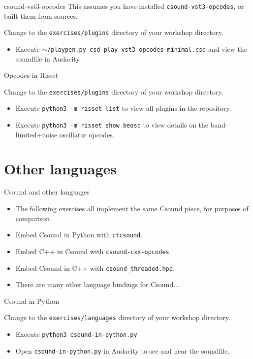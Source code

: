 \documentclass{beamer}
\begin{document}
\begin{frame}{csound-vst3-opcodes}
This assumes you have installed \texttt{csound-vst3-opcodes}, or built them from sources.
\begin{example}
Change to the \texttt{exercises/plugins} directory of your workshop directory.
\begin{itemize}
\item Execute \texttt{$\sim$/playpen.py csd-play vst3-opcodes-minimal.csd} and view the soundfile in Audacity.
\end{itemize}
\end{example}
\end{frame}

\begin{frame}{Opcodes in Risset}
\begin{example}
Change to the \texttt{exercises/plugins} directory of your workshop directory.
\begin{itemize}
\item Execute \texttt{python3 -m risset list} to view all plugins in the repository.
\item Execute \texttt{python3 -m risset show beosc} to view details on the band-limited+noise  oscillator opcodes.
\end{itemize}
\end{example}
\end{frame}

\section{Other languages}
\begin{frame}{Csound and other languages}
\begin{itemize}
\item The following exercises all implement the same Csound piece, for purposes of comparison.
\item Embed Csound in Python with \texttt{ctcsound}.
\item Embed C++ in Csound with \texttt{csound-cxx-opcodes}.
\item Embed Csound in C++ with \texttt{csound\_threaded.hpp}.
\item There are many other language bindings for Csound....
\end{itemize}
\end{frame}

\begin{frame}{Csound in Python}
\begin{example}
Change to the \texttt{exercises/languages} directory of your workshop directory.
\begin{itemize}
\item Execute \texttt{python3 csound-in-python.py}
\item Open \texttt{csound-in-python.py} in Audacity to see and hear the soundfile.
\end{itemize}
\end{example}
\end{frame}
\end{document}
